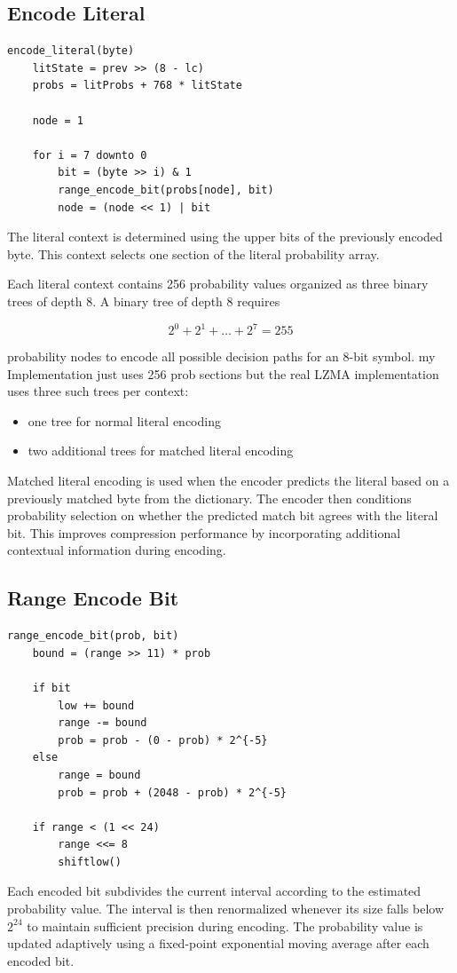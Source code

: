 \subsection{Encode Literal}

\begin{Verbatim}[frame=single,fontsize=\footnotesize]
encode_literal(byte)
    litState = prev >> (8 - lc)
    probs = litProbs + 768 * litState

    node = 1

    for i = 7 downto 0
        bit = (byte >> i) & 1
        range_encode_bit(probs[node], bit)
        node = (node << 1) | bit
\end{Verbatim}

The literal context is determined using the upper bits of the previously encoded byte. This context selects one section of the literal probability array.

Each literal context contains 256 probability values organized as three binary trees of depth 8. A binary tree of depth 8 requires

\[
2^0 + 2^1 + \dots + 2^7 = 255
\]

probability nodes to encode all possible decision paths for an 8-bit symbol.
my Implementation just uses 256 prob sections but the real
LZMA implementation uses three such trees per context:

\begin{itemize}
\item one tree for normal literal encoding
\item two additional trees for matched literal encoding
\end{itemize}

Matched literal encoding is used when the encoder predicts the literal based on a previously matched byte from the dictionary. The encoder then conditions probability selection on whether the predicted match bit agrees with the literal bit. This improves compression performance by incorporating additional contextual information during encoding.

\subsection{Range Encode Bit}

\begin{Verbatim}[frame=single,fontsize=\footnotesize]
range_encode_bit(prob, bit)
    bound = (range >> 11) * prob

    if bit
        low += bound
        range -= bound
        prob = prob - (0 - prob) * 2^{-5}
    else
        range = bound
        prob = prob + (2048 - prob) * 2^{-5}

    if range < (1 << 24)
        range <<= 8
        shiftlow()
\end{Verbatim}

Each encoded bit subdivides the current interval according to the estimated probability value. The interval is then renormalized whenever its size falls below $2^{24}$ to maintain sufficient precision during encoding. The probability value is updated adaptively using a fixed-point exponential moving average after each encoded bit.

